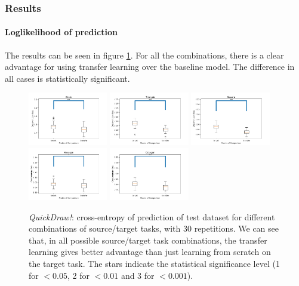     \subsubsection{Results}
      \paragraph{Loglikelihood of prediction}
        The results can be seen in figure \ref{fig:quickdraw_crossentropy}. For all the combinations, there is a clear advantage for using transfer learning over the baseline model. The difference in all cases is statistically significant.
        \begin{figure}
          \centering
            \includegraphics[width=0.31\textwidth]{images/sota/quickdraw_results/cir_ce.png}\quad
            \includegraphics[width=0.31\textwidth]{images/sota/quickdraw_results/tri_ce.png}\quad
            \includegraphics[width=0.31\textwidth]{images/sota/quickdraw_results/sq_ce.png}\quad
            \includegraphics[width=0.31\textwidth]{images/sota/quickdraw_results/hex_ce.png}\quad
            \includegraphics[width=0.31\textwidth]{images/sota/quickdraw_results/oct_ce.png}\quad
          \caption{\textit{QuickDraw!}: cross-entropy of prediction of test dataset for different combinations of source/target tasks, with 30 repetitions. We can see that, in all possible source/target task combinations, the transfer learning gives better advantage than just learning from scratch on the target task. The stars indicate the statistical significance level (1 for $<0.05$, 2 for $<0.01$ and 3 for $<0.001$).}
          \label{fig:quickdraw_crossentropy}
        \end{figure}


